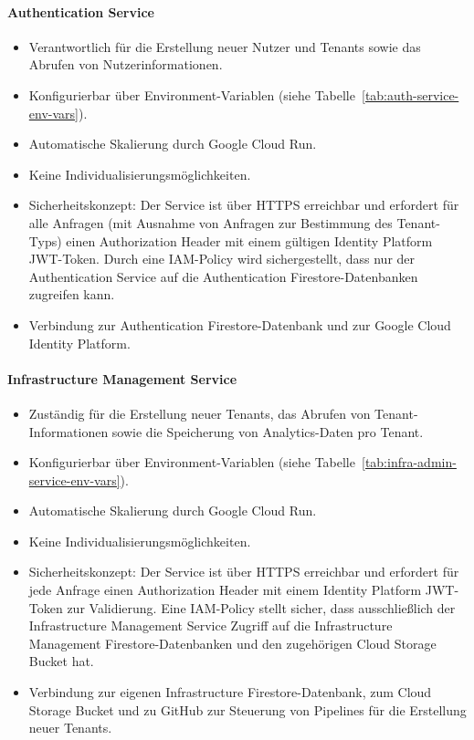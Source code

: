 \paragraph{Authentication Service}
\label{sec:auth-service}
\begin{itemize}
	\item Verantwortlich für die Erstellung neuer Nutzer und Tenants sowie das Abrufen von Nutzerinformationen.
	\item Konfigurierbar über Environment-Variablen (siehe Tabelle~\ref{tab:auth-service-env-vars}).
	\item Automatische Skalierung durch Google Cloud Run.
	\item Keine Individualisierungsmöglichkeiten.
	\item Sicherheitskonzept: Der Service ist über HTTPS erreichbar und erfordert für alle Anfragen (mit Ausnahme von Anfragen zur Bestimmung des Tenant-Typs) einen Authorization Header mit einem gültigen Identity Platform JWT-Token. Durch eine IAM-Policy wird sichergestellt, dass nur der Authentication Service auf die Authentication Firestore-Datenbanken zugreifen kann.
	\item Verbindung zur Authentication Firestore-Datenbank und zur Google Cloud Identity Platform.
\end{itemize}

\paragraph{Infrastructure Management Service}
\begin{itemize}
	\item Zuständig für die Erstellung neuer Tenants, das Abrufen von Tenant-Informationen sowie die Speicherung von Analytics-Daten pro Tenant.
	\item Konfigurierbar über Environment-Variablen (siehe Tabelle~\ref{tab:infra-admin-service-env-vars}).
	\item Automatische Skalierung durch Google Cloud Run.
	\item Keine Individualisierungsmöglichkeiten.
	\item Sicherheitskonzept: Der Service ist über HTTPS erreichbar und erfordert für jede Anfrage einen Authorization Header mit einem Identity Platform JWT-Token zur Validierung. Eine IAM-Policy stellt sicher, dass ausschließlich der Infrastructure Management Service Zugriff auf die Infrastructure Management Firestore-Datenbanken und den zugehörigen Cloud Storage Bucket hat.
	\item Verbindung zur eigenen Infrastructure Firestore-Datenbank, zum Cloud Storage Bucket und zu GitHub zur Steuerung von Pipelines für die Erstellung neuer Tenants.
\end{itemize}

